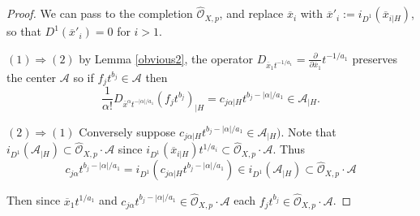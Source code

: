 \documentclass{amsart}
\newcommand{\cA}{{\mathcal A}}
\newcommand{\cC}{{\mathcal C}}
\renewcommand{\cD}{{\mathcal D}}
\newcommand{\cO}{{\mathcal O}}
\newcommand{\Int}{{\operatorname{Int}}}
\newcommand{\inte}{{\operatorname{int}}}
\begin{document}
\begin{proof} We can pass to the completion $\widehat{\cO}_{X,p}$, and replace $\overline{x}_i$ with $\overline{x}'_i :=i_{D^1}(\overline{x}_{i|H})$, so that $D^1(\overline{x}'_i)=0$ for $i>1$. 

$(1)\Rightarrow (2)$ by Lemma \ref{obvious2}, the  operator $D_{\overline{x}_1t^{-1/a_1}}=\frac{\partial}{\partial \overline{x}_1}t^{-1/a_1}$ preserves the center $\cA$ so if $f_jt^{b_j}\in \cA$ then $$\frac{1}{\alpha!}D_{\overline{x}^\alpha t^{-|\alpha|/a_1}}(f_j t^{b_j})_{|H}=c_{j\alpha|H}t^{b_j-|\alpha|/a_1}\in \cA_{|H}.$$




 
 $(2)\Rightarrow (1)$ 
  Conversely suppose $c_{j\alpha{|H}}t^{b_j-|\alpha|/a_1}\in \cA_{|H})$. Note that  $i_{D^1}(\cA_{|H})\subset \widehat{\cO}_{X,p}\cdot \cA$  since $i_{D^1}(\overline{x}_{i|H})t^{1/a_i}\subset \widehat{\cO}_{X,p}\cdot \cA$. Thus  $$c_{j\alpha}t^{b_j-|\alpha|/a_1}=i_{D^1}(c_{j\alpha{|H}}t^{b_j-|\alpha|/a_1})\in i_{D^1}(\cA_{|H})\subset \widehat{\cO}_{X,p}\cdot \cA$$
  
  Then since  $\overline{x}_1t^{1/a_1}$  and  $c_{j\alpha}t^{b_j-|\alpha|/a_1} \in \widehat{\cO}_{X,p}\cdot\cA$ each $f_jt^{b_j}\in  \widehat{\cO}_{X,p}\cdot \cA$.
 \end{proof}


\end{document}
